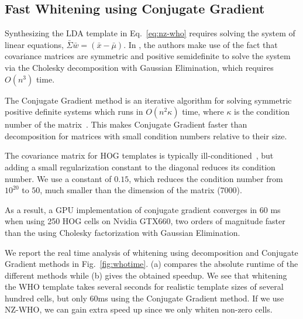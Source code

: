 \subsection{Fast Whitening using Conjugate Gradient}
\label{sec:fastwhiten}

Synthesizing the LDA template in Eq.~\ref{eq:nz-who} requires solving the system of
linear equations, $\bar{\Sigma} \bar{w} = (\bar{x} - \bar{\mu})$. In
\cite{Hariharan12}, the authors make use of the fact that covariance matrices
are symmetric and positive semidefinite to solve the system via the Cholesky
decomposition with Gaussian Elimination, which requires $O(n^3)$ time.

The Conjugate Gradient method is an iterative algorithm for solving symmetric
positive definite systems which runs in $O(n^2\kappa)$ time, where $\kappa$ is
the condition number of the matrix~\cite{Shewchuk94}.
%
This makes Conjugate Gradient faster than decomposition for matrices with small
condition numbers relative to their size.

The covariance matrix for HOG templates is typically
ill-conditioned~\cite{Hariharan12}, but adding a small regularization constant to
the diagonal reduces its condition number.
We use a constant of $0.15$, which reduces the condition number from $10^{20}$
to $50$, much smaller than the dimension of the matrix (7000).

As a result, a GPU implementation of conjugate gradient converges in 60
ms when using 250 HOG cells on Nvidia GTX660, two orders of magnitude faster
than the using Cholesky factorization with Gaussian Elimination.

We report the real time analysis of whitening using decomposition and
Conjugate Gradient methods in Fig.~\ref{fig:whotime}. (a) compares the
absolute runtime of the different methods while (b) gives the obtained
speedup. We see that %
whitening the WHO template takes several seconds for realistic template sizes of
several hundred cells, but only 60ms using the Conjugate Gradient
method. If we use NZ-WHO, we can gain extra speed
up since we only whiten non-zero cells.

